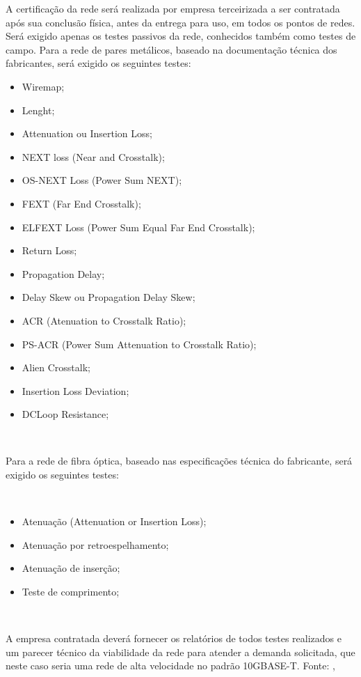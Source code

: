 \documentclass[	DIV=calc,%
							paper=a4,%
							fontsize=12pt,%
							onecolumn]{scrartcl}	 					%
\begin{document}
A certificação da rede será realizada por empresa terceirizada a ser contratada após sua conclusão física, antes da entrega para uso, em todos os pontos de redes. Será exigido apenas os testes passivos da rede, conhecidos também como testes de campo. Para a rede de pares metálicos, baseado na documentação técnica dos fabricantes,  será exigido os seguintes testes:
\\
\begin{itemize}	
	\item Wiremap;
	\item Lenght;
	\item Attenuation ou Insertion Loss;
	\item NEXT loss (Near and Crosstalk);
	\item OS-NEXT Loss (Power Sum NEXT);
	\item FEXT (Far End Crosstalk);
	\item ELFEXT Loss (Power Sum Equal Far End Crosstalk);
	\item Return Loss;
	\item Propagation Delay;
	\item Delay Skew ou Propagation Delay Skew;
	\item ACR (Atenuation to Crosstalk Ratio);
	\item PS-ACR (Power Sum Attenuation to Crosstalk Ratio);
	\item Alien Crosstalk;
	\item Insertion Loss Deviation;
	\item DCLoop Resistance;	
\end{itemize}

\

Para a rede de fibra óptica, baseado nas especificações técnica do fabricante, será exigido os seguintes testes:

\

\begin{itemize}	
	\item Atenuação (Attenuation or Insertion Loss);
	\item Atenuação por retroespelhamento;
	\item Atenuação de inserção;
	\item Teste de comprimento;
\end{itemize}

\

A empresa contratada deverá fornecer os relatórios de todos testes realizados e um parecer técnico da viabilidade da rede para atender a demanda solicitada, que neste caso seria uma rede de alta velocidade no padrão 10GBASE-T. Fonte: \cite{ID2}, \cite{ID3}
\end{document}
